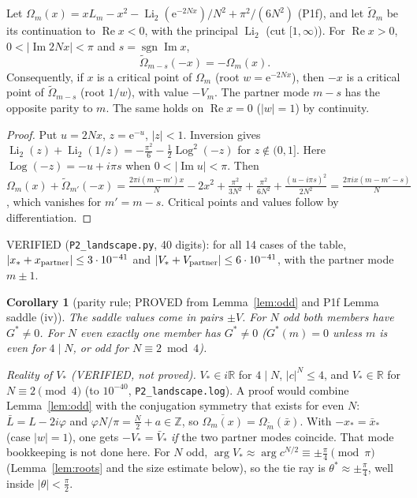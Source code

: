 \documentclass[11pt]{article}
\newtheorem{corollary}[theorem]{Corollary}
\theoremstyle{remark}\newtheorem{remark}[theorem]{Remark}
\newcommand{\e}{\mathrm{e}}
\newcommand{\Li}{\operatorname{Li}_2}
\begin{document}
\begin{lemma}\label{lem:odd}
Let $\Omega_m(x)=xL_m-x^2-\Li(\e^{-2Nx})/N^2+\pi^2/(6N^2)$ (P1f), and let $\tilde\Omega_m$ be its continuation to
$\operatorname{Re}x<0$, with the principal $\Li$ (cut $[1,\infty)$). For $\operatorname{Re}x>0$, $0<|\operatorname{Im}2Nx|<\pi$ and
$s=\operatorname{sgn}\operatorname{Im}x$,
\[\tilde\Omega_{m-s}(-x)=-\Omega_m(x).\]
Consequently, if $x$ is a critical point of $\Omega_m$ (root $w=\e^{-2Nx}$), then $-x$ is a critical point of $\tilde\Omega_{m-s}$ (root $1/w$),
with value $-V_m$. The partner mode $m-s$ has the opposite parity to $m$. The same holds on $\operatorname{Re}x=0$ ($|w|=1$) by continuity.
\end{lemma}
\begin{proof}
Put $u=2Nx$, $z=\e^{-u}$, $|z|<1$. Inversion gives $\Li(z)+\Li(1/z)=-\frac{\pi^2}6-\frac12\operatorname{Log}^2(-z)$ for $z\notin(0,1]$.
Here $\operatorname{Log}(-z)=-u+i\pi s$ when $0<|\operatorname{Im}u|<\pi$. Then
$\Omega_m(x)+\tilde\Omega_{m'}(-x)=\frac{2\pi i(m-m')x}N-2x^2+\frac{\pi^2}{3N^2}+\frac{\pi^2}{6N^2}+\frac{(u-i\pi s)^2}{2N^2}
=\frac{2\pi ix(m-m'-s)}N$, which vanishes for $m'=m-s$. Critical points and values follow by differentiation.
\end{proof}
VERIFIED (\texttt{P2\_landscape.py}, 40 digits): for all 14 cases of the table, $|x_*+x_{\rm partner}|\le3\cdot10^{-41}$ and
$|V_*+V_{\rm partner}|\le6\cdot10^{-41}$, with the partner mode $m\pm1$.

\begin{corollary}[parity rule; PROVED from Lemma~\ref{lem:odd} and P1f Lemma saddle (iv)]\label{cor:parity}
The saddle values come in pairs $\pm V$. For $N$ odd both members have $G^*\ne0$. For $N$ even exactly one member has $G^*\ne0$
($G^*(m)=0$ unless $m$ is even for $4\mid N$, or odd for $N\equiv2\bmod4$).
\end{corollary}
\emph{Reality of $V_*$ (VERIFIED, not proved).} $V_*\in i\mathbb R$ for $4\mid N$, $|c|^N\le4$, and $V_*\in\mathbb R$ for $N\equiv2\pmod4$ (to $10^{-40}$,
\texttt{P2\_landscape.log}). A proof would combine Lemma~\ref{lem:odd} with the conjugation symmetry that exists for even $N$: $\bar L=L-2i\varphi$ and
$\varphi N/\pi=\frac N2+a\in\mathbb Z$, so $\overline{\Omega_m(x)}=\Omega_{\tilde m}(\bar x)$. With $-x_*=\bar x_*$ (case $|w|=1$), one gets $-V_*=\bar V_*$
\emph{if} the two partner modes coincide. That mode bookkeeping is not done here.
For $N$ odd, $\arg V_*\approx\arg c^{N/2}\equiv\pm\frac\pi4\pmod\pi$ (Lemma~\ref{lem:roots} and the size estimate below), so the tie ray is
$\theta^*\approx\pm\frac\pi4$, well inside $|\theta|<\frac\pi2$.
\end{document}

